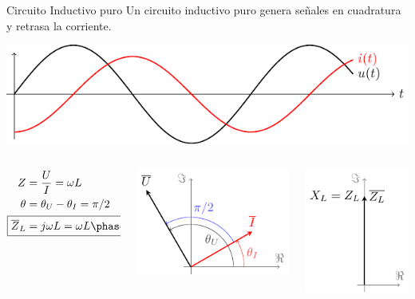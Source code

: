 \documentclass[aspectratio=169, usenames,svgnames,dvipsnames]{beamer}
\begin{document}
\begin{frame}[label={sec:orgc872c64}]{Circuito Inductivo puro}
Un circuito inductivo puro genera \alert{señales en cuadratura} y \alert{retrasa la corriente}.

\begin{center}
\includegraphics[height=0.3\textheight]{../figs/inductivoPuro.pdf}
\end{center}

\begin{columns}
\begin{column}{0.3\columnwidth}
\begin{align*}
  Z &= \frac{U}{I} = \omega L\\
  \theta &= \theta_U - \theta_I = \pi/2\\
  \Aboxed{\overline{Z}_L &= j\omega L = \omega L \phase{\ang{90}}}
\end{align*}
\end{column}


\begin{column}{0.4\columnwidth}
\begin{center}
\includegraphics[height=0.4\textheight]{../figs/fasorInductancia_VI.pdf}
\end{center}
\end{column}


\begin{column}{0.3\columnwidth}
\begin{center}
\includegraphics[height=0.4\textheight]{../figs/fasorInductancia.pdf}
\end{center}
\end{column}
\end{columns}
\end{frame}
\end{document}

